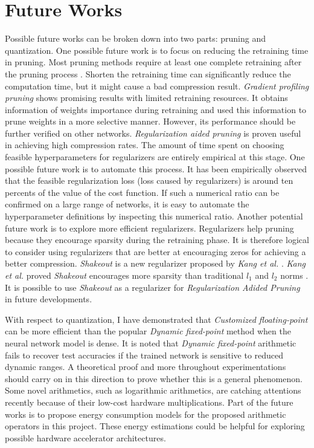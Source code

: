 \documentclass[a4paper,12pt]{report}
\begin{document}
\section{Future Works}
Possible future works can be broken down into two parts: pruning and quantization.
One possible future work is to focus on reducing the retraining time in pruning.
Most pruning methods require at least one complete retraining after the pruning
process \cite{Thimm, Li2016}.
Shorten the retraining time can significantly reduce the computation time,
but it might cause a bad compression result.
\textit{Gradient profiling pruning} shows promising results with limited retraining
resources.
It obtains information of weights importance during retraining and used this
information to prune weights in a more selective manner.
However, its performance should be further verified on other networks.
\textit{Regularization aided pruning} is proven useful in achieving high
compression rates.
The amount of time spent on choosing feasible hyperparameters for regularizers
are entirely empirical at this stage.
One possible future work is to automate this process.
It has been empirically observed that the feasible regularization loss (loss caused by regularizers)
is around ten percents of the value of the cost function.
If such a numerical ratio can be confirmed on a large range of networks, it is
easy to automate the hyperparameter definitions by inspecting this numerical ratio.
Another potential future work is to explore more efficient regularizers.
Regularizers help pruning because they encourage sparsity during the retraining
phase.
It is therefore logical to consider using regularizers that are better at
encouraging zeros for achieving a better compression.
\textit{Shakeout} is a new regularizer proposed by \textit{Kang et al.} \cite{Kang}.
\textit{Kang et al.} proved \textit{Shakeout} encourages more sparsity than
traditional $l_1$ and $l_2$ norms \cite{Kang}.
It is possible to use \textit{Shakeout} as a regularizer for \textit{Regularization Adided Pruning}
in future developments.

With respect to quantization, I have demonstrated that \textit{Customized floating-point}
can be more efficient than the popular \textit{Dynamic fixed-point} method when
the neural network model is dense.
It is noted that \textit{Dynamic fixed-point} arithmetic fails to recover
test accuracies if the trained network is sensitive to reduced dynamic ranges.
A theoretical proof and more throughout experimentations should carry on
in this direction to prove whether this is a general phenomenon.
Some novel arithmetics, such as logarithmic arithmetics, are catching attentions
recently \cite{tann2017hardware} because of their low-cost hardware multiplications.
Part of the future works is to propose energy consumption models for the
proposed arithmetic operators in this project.
These energy estimations could be helpful for exploring possible hardware accelerator architectures.
\end{document}
